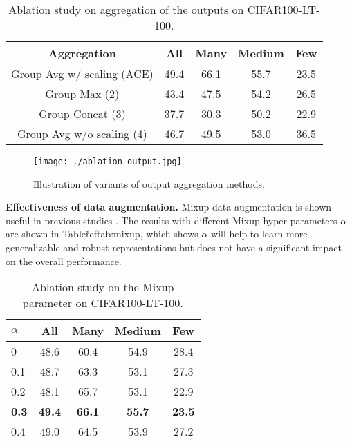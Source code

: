 \begin{table}[h]
\begin{center}
\small
\begin{tabular}{c|c|c c c}
\toprule[1.5pt]
\textbf{Aggregation} &  \textbf{All} & \textbf{Many} & \textbf{Medium} & \textbf{Few}\\\hline\hline
Group Avg w/ scaling (ACE) &  49.4 & 66.1 & 55.7 & 23.5\\
Group Max (2) &  43.4 & 47.5 & 54.2 & 26.5 \\
Group Concat (3)   & 37.7 &  30.3 & 50.2 & 22.9 \\
Group Avg w/o scaling (4)  & 46.7 & 49.5  &53.0 & 36.5\\
\bottomrule[1.5pt]
\end{tabular}
\end{center}
\caption{Ablation study on aggregation of the outputs on CIFAR100-LT-100.}
\label{tab:abs-agg}
\end{table}

\begin{figure}
\begin{center}
\texttt{[image: ./ablation\_output.jpg]}
\end{center}
   \caption{Illustration of variants of output aggregation methods.}
\label{fig:abl-out}
\end{figure}

\textbf{Effectiveness of data augmentation.} Mixup data augmentation is shown useful in previous studies \cite{zhou2020bbn, chou2020remix, zhang2021bag}. The results with different Mixup hyper-parameters $\alpha$ are shown in Table\~ref{tab:mixup}, which shows $\alpha$ will help to learn more generalizable and robust representations but does not have a significant impact on the overall performance.

\begin{table}[t]
\begin{center}
\small
\begin{tabular}{p{0.8cm}|c|c c c}
\toprule[1.5pt]
\textbf{$\alpha$} &  \textbf{All} & \textbf{Many} & \textbf{Medium} & \textbf{Few}\\\hline\hline
0 &  48.6 & 60.4 & 54.9 & 28.4\\
0.1 &  48.7 & 63.3 & 53.1 & 27.3 \\
0.2 & 48.1 &  65.7 & 53.1 & 22.9 \\
\textbf{0.3} & \textbf{49.4} & \textbf{66.1} & \textbf{55.7} & \textbf{23.5}\\
0.4 & 49.0 & 64.5  & 53.9 & 27.2\\
\bottomrule[1.5pt]
\end{tabular}
\end{center}
\caption{Ablation study on the Mixup parameter on CIFAR100-LT-100.}
\label{tab:abs-agg}
\end{table}

